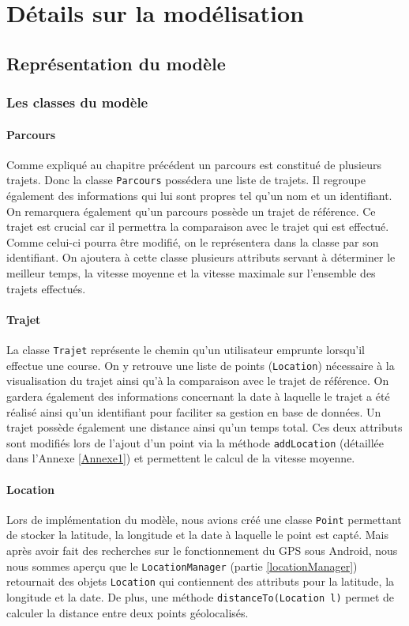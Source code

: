 \chapter{Détails sur la modélisation}
\section{Représentation du modèle}

\subsection{Les classes du modèle}
\subsubsection{Parcours}
Comme expliqué au chapitre précédent un parcours est constitué de plusieurs trajets. Donc la classe \verb!Parcours! possédera une liste de trajets. Il regroupe également des informations qui lui sont propres tel qu'un nom et un identifiant. On remarquera également qu'un parcours possède un trajet de référence. Ce trajet est crucial car il permettra la comparaison avec le trajet qui est effectué. Comme celui-ci pourra être modifié, on le représentera dans la classe par son identifiant. On ajoutera à cette classe plusieurs attributs servant à déterminer le meilleur temps, la vitesse moyenne et la vitesse maximale sur l'ensemble des trajets effectués.

\subsubsection{Trajet}
La classe \verb!Trajet! représente le chemin qu'un utilisateur emprunte lorsqu'il effectue une course. On y retrouve une liste de points (\verb!Location!) nécessaire à la visualisation du trajet ainsi qu'à la comparaison avec le trajet de référence. On gardera également des  informations concernant la date à laquelle le trajet a été réalisé ainsi qu'un identifiant pour faciliter sa gestion en base de données. Un trajet possède également une distance ainsi qu'un temps total. Ces deux attributs sont modifiés lors de l'ajout d'un point via la méthode \verb!addLocation! (détaillée dans l'Annexe \ref{Annexe1}) et permettent le calcul de la vitesse moyenne.

\subsubsection{Location}
Lors de implémentation du modèle, nous avions créé une classe \verb!Point! permettant de stocker la latitude, la longitude et la date à laquelle le point est capté. Mais après avoir fait des recherches sur le fonctionnement du GPS sous Android, nous nous sommes aperçu que le \verb!LocationManager! (partie \ref{locationManager}) retournait des objets \verb!Location! qui contiennent des attributs pour la latitude, la longitude et la date. De plus, une méthode \verb!distanceTo(Location l)! permet de calculer la distance entre deux points géolocalisés. 

